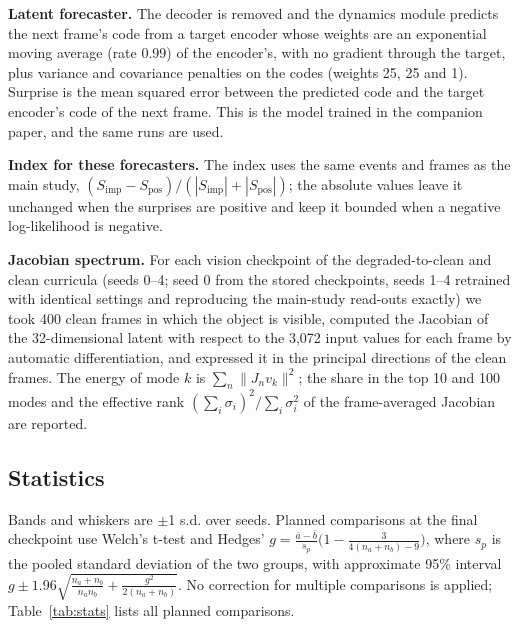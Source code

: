 \documentclass{article}
\theoremstyle{plain}
\theoremstyle{remark}
\begin{document}
\textbf{Latent forecaster.} The decoder is removed and the dynamics module predicts the next frame's code from a target encoder whose weights are an exponential moving average (rate 0.99) of the encoder's, with no gradient through the target, plus variance and covariance penalties on the codes (weights 25, 25 and 1). Surprise is the mean squared error between the predicted code and the target encoder's code of the next frame. This is the model trained in the companion paper, and the same runs are used.

\textbf{Index for these forecasters.} The index uses the same events and frames as the main study, \((S_{\text{imp}}-S_{\text{pos}})/(|S_{\text{imp}}|+|S_{\text{pos}}|)\); the absolute values leave it unchanged when the surprises are positive and keep it bounded when a negative log-likelihood is negative.

\textbf{Jacobian spectrum.} For each vision checkpoint of the degraded-to-clean and clean curricula (seeds 0--4; seed 0 from the stored checkpoints, seeds 1--4 retrained with identical settings and reproducing the main-study read-outs exactly) we took 400 clean frames in which the object is visible, computed the Jacobian of the 32-dimensional latent with respect to the 3,072 input values for each frame by automatic differentiation, and expressed it in the principal directions of the clean frames. The energy of mode \(k\) is \(\sum_n\lVert J_nv_k\rVert^2\); the share in the top 10 and 100 modes and the effective rank \((\sum_i\sigma_i)^2/\sum_i\sigma_i^2\) of the frame-averaged Jacobian are reported.

\subsection{Statistics}

Bands and whiskers are \ensuremath{\pm}1 s.d. over seeds. Planned comparisons at the final checkpoint use Welch's t-test and Hedges' \(g=\frac{\bar a-\bar b}{s_p}\big(1-\frac{3}{4(n_a+n_b)-9}\big)\), where \(s_p\) is the pooled standard deviation of the two groups, with approximate 95\% interval \(g\pm1.96\sqrt{\frac{n_a+n_b}{n_an_b}+\frac{g^2}{2(n_a+n_b)}}\). No correction for multiple comparisons is applied; Table~\ref{tab:stats} lists all planned comparisons.
\end{document}
